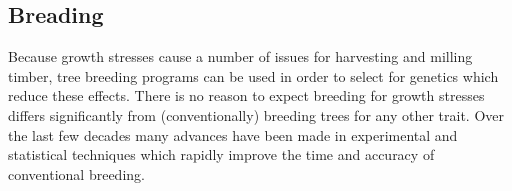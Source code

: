 \subsection{Breading}
Because growth stresses cause a number of issues for harvesting and milling
timber, tree breeding programs can be used in order to select for
genetics which reduce these effects. There is no reason to expect  breeding for
growth stresses differs significantly from (conventionally) breeding trees for
any other trait. Over the last few decades many advances have been made in
experimental and statistical techniques which rapidly improve the time and
accuracy of conventional breeding.